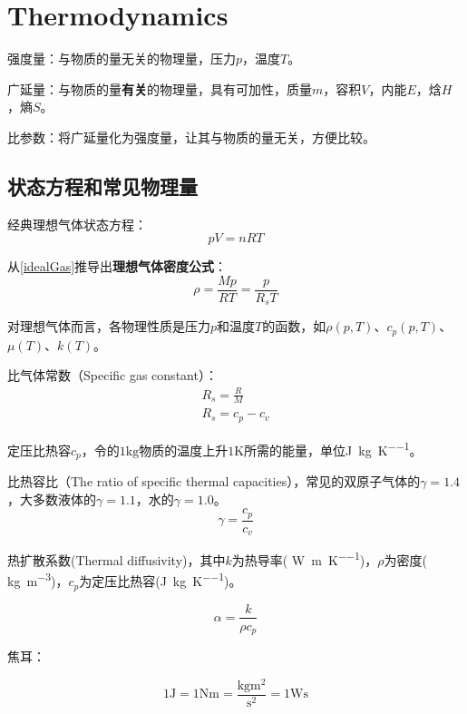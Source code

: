 \chapter{Thermodynamics}
强度量：与物质的量无关的物理量，压力$ p $，温度$ T $。

广延量：与物质的量\textbf{有关}的物理量，具有可加性，质量$ m $，容积$ V $，内能$ E $，焓$ H $，熵$ S $。

比参数：将广延量化为强度量，让其与物质的量无关，方便比较。

\section{状态方程和常见物理量}

经典理想气体状态方程：
\begin{equation}
\label{idealGas}
pV=nRT
\end{equation}

从\autoref{idealGas}推导出\textbf{理想气体密度公式}：
\begin{equation}
\rho = \frac{Mp}{RT} = \frac{p}{R_s T}
\end{equation}

对理想气体而言，各物理性质是压力$ p $和温度$ T $的函数，如$ \rho(p,T) $、$ c_p(p,T) $、$ \mu(T) $、$ k(T) $。

比气体常数（Specific gas constant）：
\begin{gather}
R_s = \frac{R}{M} \\
R_s = c_p - c_v
\end{gather}

定压比热容$ c_p $，令的$ 1\si{\kilogram} $物质的温度上升$ 1\si{\kelvin} $所需的能量，单位\si{\joule\per\kilogram\per\kelvin}。

比热容比（The ratio of specific thermal capacities），常见的双原子气体的$ \gamma=1.4 $，大多数液体的$ \gamma=1.1 $，水的$ \gamma=1.0 $。
\begin{equation}
\gamma = \frac{c_p}{c_v}
\end{equation}

热扩散系数(Thermal diffusivity)，其中$ k $为热导率( \si{\watt\per\meter\per\kelvin})，$ \rho $为密度( \si{\kilogram\per\cubic\meter})，$ c_p $为定压比热容(\si{\joule\per\kilogram\per\kelvin})。

\begin{equation}
\alpha = \frac{k}{\rho c_p}
\end{equation}

焦耳：

\[1\si{\joule} = 1\si{\newton\meter} = \frac{\si{\kilogram\meter\squared}}{\si{\second\squared}} = 1\si{\watt\second} \]

